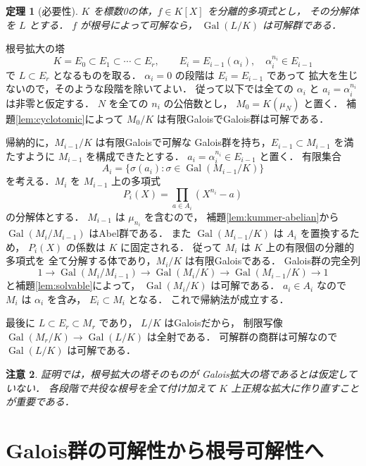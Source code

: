\documentclass[a5paper,10pt,onecolumn]{jsarticle}
\makeatletter
\theoremstyle{mathnotetheorem}
\newtheorem{theorem}{定理}[section]
\newtheorem{remark}[theorem]{注意}
\renewcommand{\proofname}{証明}
\renewenvironment{proof}[1][\proofname]{%
  \par\pushQED{\qed}\normalfont\topsep4\p@\@plus2\p@\relax
  \trivlist\item[\hskip\labelsep\bfseries #1]\ignorespaces
}{\popQED\endtrivlist\@endpefalse}
\makeatother
\begin{document}
\begin{theorem}[必要性]\label{thm:necessary}
$K$ を標数0の体，$f\in K[X]$ を分離的多項式とし，
その分解体を $L$ とする．
$f$ が根号によって可解なら，
$\operatorname{Gal}(L/K)$ は可解群である．
\end{theorem}
\begin{proof}
根号拡大の塔
\[
 K=E_0\subset E_1\subset\cdots\subset E_r,\qquad
 E_i=E_{i-1}(\alpha_i),\quad \alpha_i^{n_i}\in E_{i-1}
\]
で $L\subset E_r$ となるものを取る．
$\alpha_i=0$ の段階は $E_i=E_{i-1}$ であって
拡大を生じないので，そのような段階を除いてよい．
従って以下では全ての $\alpha_i$ と
$a_i=\alpha_i^{n_i}$ は非零と仮定する．
$N$ を全ての $n_i$ の公倍数とし，
$M_0=K(\mu_N)$ と置く．
補題\ref{lem:cyclotomic}によって
$M_0/K$ は有限GaloisでGalois群は可解である．

帰納的に，$M_{i-1}/K$ は有限Galoisで可解な
Galois群を持ち，$E_{i-1}\subset M_{i-1}$ を満たすように
$M_{i-1}$ を構成できたとする．
$a_i=\alpha_i^{n_i}\in E_{i-1}$ と置く．
有限集合
\[
 A_i=\{\sigma(a_i):\sigma\in\operatorname{Gal}(M_{i-1}/K)\}
\]
を考える．$M_i$ を $M_{i-1}$ 上の多項式
\[
 P_i(X)=\prod_{a\in A_i}(X^{n_i}-a)
\]
の分解体とする．
$M_{i-1}$ は $\mu_{n_i}$ を含むので，
補題\ref{lem:kummer-abelian}から
$\operatorname{Gal}(M_i/M_{i-1})$ はAbel群である．
また $\operatorname{Gal}(M_{i-1}/K)$ は
$A_i$ を置換するため，
$P_i(X)$ の係数は $K$ に固定される．
従って $M_i$ は $K$ 上の有限個の分離的多項式を
全て分解する体であり，$M_i/K$ は有限Galoisである．
Galois群の完全列
\[
 1\to\operatorname{Gal}(M_i/M_{i-1})
 \to\operatorname{Gal}(M_i/K)
 \to\operatorname{Gal}(M_{i-1}/K)\to1
\]
と補題\ref{lem:solvable}によって，
$\operatorname{Gal}(M_i/K)$ は可解である．
$a_i\in A_i$ なので $M_i$ は $\alpha_i$ を含み，
$E_i\subset M_i$ となる．
これで帰納法が成立する．

最後に $L\subset E_r\subset M_r$ であり，
$L/K$ はGaloisだから，
制限写像
$\operatorname{Gal}(M_r/K)\to\operatorname{Gal}(L/K)$
は全射である．
可解群の商群は可解なので
$\operatorname{Gal}(L/K)$ は可解である．
\end{proof}

\begin{remark}
証明では，根号拡大の塔そのものが
Galois拡大の塔であるとは仮定していない．
各段階で共役な根号を全て付け加えて
$K$ 上正規な拡大に作り直すことが重要である．
\end{remark}

\section{Galois群の可解性から根号可解性へ}
\end{document}
